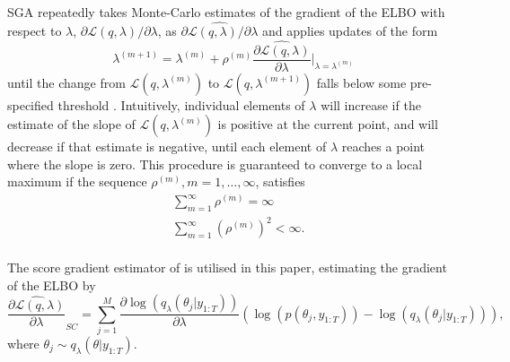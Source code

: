 \documentclass[12pt,a4paper]{article}\usepackage[]{graphicx}\usepackage[]{color}
\begin{document}
SGA repeatedly takes Monte-Carlo estimates of the gradient of the ELBO with respect to $\lambda$, $\partial\mathcal{L}(q, \lambda) / \partial \lambda$, as $\widehat{\partial\mathcal{L}(q, \lambda) / \partial \lambda}$ and applies updates of the form
\begin{equation}
\label{gradientAscent}
\lambda^{(m+1)} = \lambda^{(m)} + \rho^{(m)} \widehat{\frac{\partial\mathcal{L}(q, \lambda)}{\partial \lambda}} \bigg\rvert_{\lambda = \lambda^{(m)}}
\end{equation}
until the change from $\mathcal{L}(q, \lambda^{(m)})$ to $\mathcal{L}(q, \lambda^{(m+1)})$ falls below some pre-specified threshold \citep{Hoffman2013}. Intuitively, individual elements of $\lambda$ will increase if the estimate of the slope of $\mathcal{L}(q, \lambda^{(m)})$ is positive at the current point, and will decrease if that estimate is negative, until each element of $\lambda$ reaches a point where the slope is zero. This procedure is guaranteed to converge to a local maximum \citep{Robbins1951} if the sequence $\rho^{(m)}, m = 1, \dots, \infty$, satisfies
\begin{align}
&\sum_{m=1}^{\infty} \rho^{(m)} =  \infty \\
&\sum_{m=1}^{\infty} (\rho^{(m)})^2 <  \infty.
\end{align}
\\

The score gradient estimator of \citet{Ranganath2014} is utilised in this paper, estimating the gradient of the ELBO by
\begin{equation}
\label{scoreDeriv}
\widehat{\frac{\partial\mathcal{L}(q, \lambda)}{\partial \lambda}}_{SC} = \sum_{j = 1}^M \frac{\partial \log(q_{\lambda}(\theta_{j} | y_{1:T}))}{\partial \lambda} \left(\log(p(\theta_{j}, y_{1:T})) - \log(q_{\lambda}(\theta_{j} | y_{1:T})) \right),
\end{equation}
where $\theta_{j} \sim q_{\lambda}(\theta | y_{1:T})$.
\end{document}
